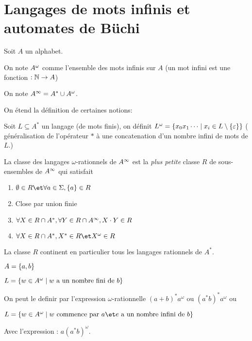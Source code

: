 \section{Langages de mots infinis et automates de Büchi}


\begin{notation}
	Soit $A$ un alphabet.

	On note $A^{\omega}$ comme l'ensemble des mots infinis sur $A$
	(un mot infini est une fonction $: \mathbb{N} \to A$)

	On note $A^{\infty} = A^* \cup A^{\omega}$.

	On étend la définition de certaines notions:

	Soit $L \subseteq A^*$ un langage (de mots finis), on définit
	$L^{\omega} = \left\{x_0x_1\cdots \mid x_i \in L \setminus \left\{\varepsilon\right\}\right\}$
	( généralisation de l'opérateur $*$ à une concatenation d'un nombre infini de mots de $L$.)
\end{notation}


\begin{definition}
	La classe des langages $\omega$-rationnels de $A^{\infty}$ est la \emph{plus petite}
	classe $R$ de sous-ensembles de $A^{\infty}$ qui satisfait
	\begin{enumerate}
		\item $\emptyset \in R \et \forall a \in \Sigma, \set a \in R$
		\item Close par union finie
		\item $\forall X \in R \cap A^*, \forall Y \in R \cap A^{\infty}, X \cdot Y \in R$ \label{omega-clot-fi}
		\item $\forall X \in R \cap A^*, X^* \in R \et X^{\omega} \in R$\label{omega-clot-op}
	\end{enumerate}
\end{definition}

\begin{remarque}
	La classe $R$ continent en particulier tous les langages rationnels de $A^*$.
\end{remarque}

\begin{exemple}
	$A = \left\{a,b\right\}$

	$L = \left\{w \in A^{\omega} \mid w \text{ a un nombre fini de } b\right\}$

	On peut le definir par l'expression $\omega$-rationnelle $(a + b)^* a^{\omega}$ ou $(a^*b)^* a^{\omega}$ ou


	$L = \setdef {w \in \aomega} {w \text{ commence par } a \et e \text{ a un nombre infini de } b}$

	Avec l'expression : $a(a^*b)^{\omega}$.
\end{exemple}

